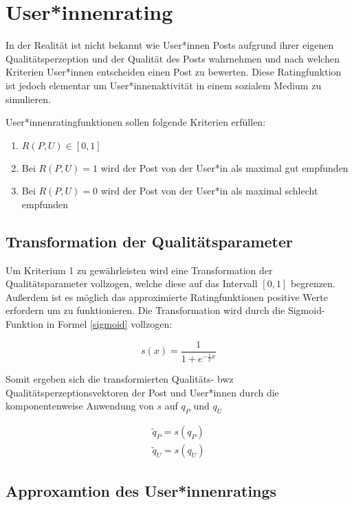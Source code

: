 \chapter{User*innenrating}

In der Realität ist nicht bekannt wie User*innen Posts aufgrund ihrer eigenen Qualitätsperzeption und der Qualität des Posts wahrnehmen und nach welchen Kriterien User*innen entscheiden einen Post zu bewerten. Diese Ratingfunktion ist jedoch elementar um User*innenaktivität in einem sozialem Medium zu simulieren. 

User*innenratingfunktionen sollen folgende Kriterien erfüllen:

\begin{enumerate}
	\item $R(P,U) \in [0,1]$
	\item Bei $R(P,U) = 1$ wird der Post von der User*in als maximal gut empfunden
	\item Bei $R(P,U) = 0$ wird der Post von der User*in als maximal schlecht empfunden
\end{enumerate}

\section{Transformation der Qualitätsparameter}

Um Kriterium 1 zu gewährleisten wird eine Transformation der Qualitätsparameter vollzogen, welche diese auf das Intervall $[0,1]$ 
begrenzen. Außerdem ist es möglich das approximierte Ratingfunktionen positive Werte erfordern um zu funktionieren. Die Transformation wird durch die {Sigmoid}-Funktion in Formel \ref{sigmoid} vollzogen:

\begin{equation}
\label{sigmoid}
s(x) = \frac{1}{1 + e^{-\frac{1}{2}x}}
\end{equation}

Somit ergeben sich die transformierten Qualitäts- bwz Qualitätsperzeptionsvektoren der Post und User*innen durch die komponentenweise Anwendung von $s$ auf $q_P$ und $q_U$

\begin{align}
\tilde{q}_P = s(q_P) \\
\tilde{q}_U = s(q_U) 
\end{align}

\section{Approxamtion des User*innenratings}

